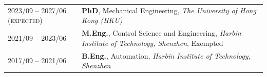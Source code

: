 %
%



\begin{tabular}{ll}
	\textsc{2023/09 -- 2027/06 (expected)}	& \textbf{PhD}, Mechanical Engineering, \emph{The University of Hong Kong (HKU)}\\
	\textsc{2021/09 -- 2023/06} 	&  \textbf{M.Eng.}, Control Science and Engineering, \emph{Harbin Institute of Technology, Shenzhen}, Exempted\\
	\textsc{2017/09 -- 2021/06} 	&  \textbf{B.Eng.}, Automation, \emph{Harbin Institute of Technology, Shenzhen}\\

\end{tabular}